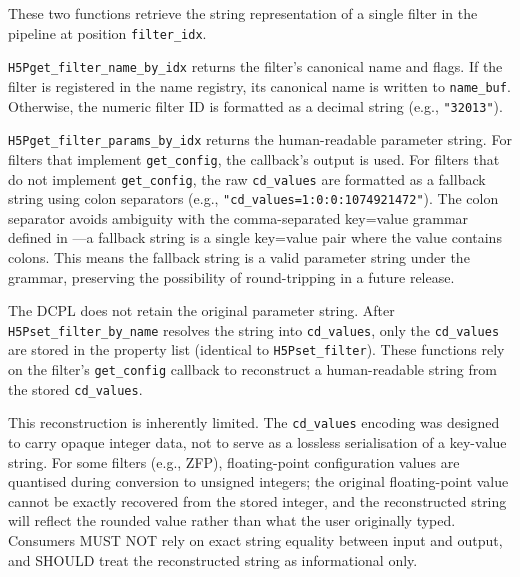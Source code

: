 \documentclass[../HDF5_RFC.tex]{subfiles}
\begin{document}
These two functions retrieve the string representation of a
single filter in the pipeline at position \texttt{filter\_idx}.

\texttt{H5Pget\_filter\_name\_by\_idx} returns the filter's canonical name and flags. If
the filter is registered in the name registry, its canonical name is written
to \texttt{name\_buf}. Otherwise, the numeric filter ID is formatted as a decimal
string (e.g., \texttt{"32013"}).

\texttt{H5Pget\_filter\_params\_by\_idx} returns the human-readable parameter string.
For filters that implement \texttt{get\_config}, the callback's output is used. For
filters that do not implement \texttt{get\_config}, the raw \texttt{cd\_values} are formatted
as a fallback string using colon separators (e.g.,
\texttt{"cd\_values=1:0:0:1074921472"}). The colon separator avoids ambiguity with
the comma-separated key=value grammar defined in ---a fallback
string is a single key=value pair where the value contains colons. This means
the fallback string is a valid parameter string under the grammar, preserving
the possibility of round-tripping in a future release.

The DCPL does not retain the original
parameter string. After \texttt{H5Pset\_filter\_by\_name} resolves the string into
\texttt{cd\_values}, only the \texttt{cd\_values} are stored in the property list (identical
to \texttt{H5Pset\_filter}). These functions rely on the filter's \texttt{get\_config}
callback to reconstruct a human-readable string from the stored \texttt{cd\_values}.

This reconstruction is inherently limited. The \texttt{cd\_values} encoding was
designed to carry opaque integer data, not to serve as a lossless serialisation
of a key-value string. For some filters (e.g., ZFP), floating-point
configuration values are quantised during conversion to unsigned integers; the
original floating-point value cannot be exactly recovered from the stored
integer, and the reconstructed string will reflect the rounded value rather
than what the user originally typed. Consumers MUST NOT rely on exact string
equality between input and output, and SHOULD treat the reconstructed string
as informational only.
\end{document}
